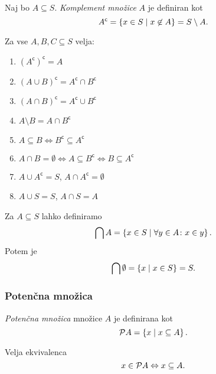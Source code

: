 \documentclass[12pt, a4paper]{article}
\renewcommand{\iff}{\Leftrightarrow}
\begin{document}
\begin{okvir}
\begin{definicija}
Naj bo $A\subseteq S$. \emph{Komplement množice} $A$ je definiran kot
\[
A^\mathsf{c}=\left\{x\in S\mid x\not\in A\right\}=S\setminus A.
\]
\end{definicija}
\end{okvir}

\begin{izrek}
Za vse $A,B,C\subseteq S$ velja:

\begin{enumerate}
\item $(A^\mathsf{c})^\mathsf{c}=A$
\item $(A\cup B)^\mathsf{c}=A^\mathsf{c}\cap B^\mathsf{c}$
\item $(A\cap B)^\mathsf{c}=A^\mathsf{c}\cup B^\mathsf{c}$
\item $A\setminus B=A\cap B^\mathsf{c}$
\item $A\subseteq B\iff B^\mathsf{c}\subseteq A^\mathsf{c}$
\item $A\cap B=\emptyset\iff A\subseteq B^\mathsf{c}\iff B\subseteq A^\mathsf{c}$
\item $A\cup A^\mathsf{c}=S$, $A\cap A^\mathsf{c}=\emptyset$
\item $A\cup S=S$, $A\cap S=A$
\end{enumerate}
\end{izrek}

\obvs

\begin{opomba}
Za $A\subseteq S$ lahko definiramo
\[
\bigcap A=\left\{x\in S\mid \forall y\in A\colon x\in y\right\}.
\]
Potem je
\[
\bigcap\emptyset=\left\{x\mid x\in S\right\}=S.
\]
\end{opomba}

\newpage

\subsubsection{Potenčna množica}

\begin{okvir}
\begin{definicija}
\emph{Potenčna množica} množice $A$ je definirana kot
\[
\mathcal{P} A=\left\{x\mid x\subseteq A\right\}.
\]
\end{definicija}
\end{okvir}

\begin{opomba}
Velja ekvivalenca
\[
x\in\pot A\iff x\subseteq A.
\]
\end{opomba}
\end{document}
